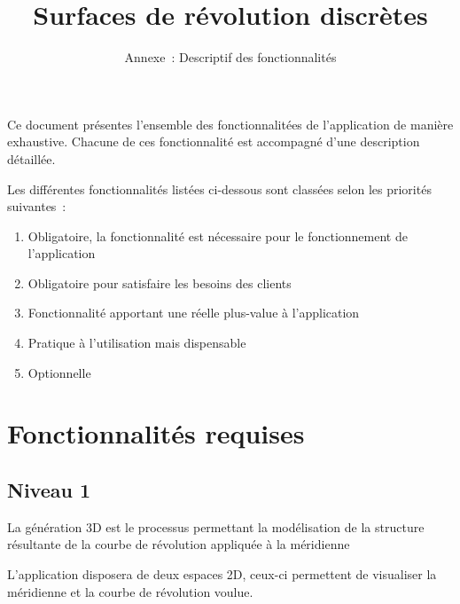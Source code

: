 \documentclass{scrartcl}
\title{Surfaces de révolution discrètes}
\subtitle{Annexe~: Descriptif des fonctionnalités}
\begin{document}

\maketitle
\newpage


	Ce document présentes l'ensemble des fonctionnalitées de l'application de manière exhaustive. Chacune de ces fonctionnalité est accompagné d'une description détaillée. %
	
	Les différentes fonctionnalités listées ci-dessous sont classées selon les priorités suivantes~:
	\begin{enumerate}
		\item Obligatoire, la fonctionnalité est nécessaire pour le fonctionnement de l'application
		\item Obligatoire pour satisfaire les besoins des clients 
		\item Fonctionnalité apportant une réelle plus-value à l'application
		\item Pratique à l'utilisation mais dispensable
		\item Optionnelle
	\end{enumerate}


	

\section{Fonctionnalités requises}

	\subsection{Niveau 1}
		\begin{itemize}
				La génération 3D est le processus permettant la modélisation de la structure résultante de la courbe de révolution appliquée à la méridienne
			
				L'application disposera de deux espaces 2D, ceux-ci permettent de visualiser la méridienne et la courbe de révolution voulue. 
		\end{itemize}
\end{document}
